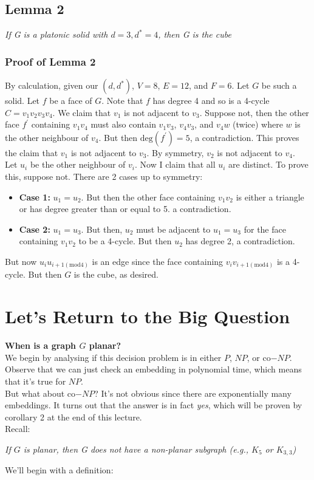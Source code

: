 \documentclass{report}
\begin{document}
\subsection{Lemma 2}
\begin{center}
\textit{If G is a platonic solid with $d = 3, d^* = 4$, then G is the cube}
\end{center}
\subsubsection{Proof of Lemma 2}
By calculation, given our $(d, d^*)$, $V = 8$, $E = 12$, and $F = 6$. Let $G$ be such a solid. Let $f$ be a face of $G$. Note that $f$ has degree 4 and so is a 4-cycle $C = v_1v_2v_3v_4$.
We claim that $v_1$ is not adjacent to $v_3$. Suppose not, then the other face $f^\prime$ containing $v_1v_4$ must also contain $v_1v_3$, $v_4v_3$, and $v_4w$ (twice) where $w$ is the other neighbour of $v_4$. But then $\mathrm{deg}(f^\prime) = 5$, a contradiction. This proves the claim that $v_1$ is not adjacent to $v_3$. By symmetry, $v_2$ is not adjacent to $v_4$.\\
Let $u_i$ be the other neighbour of $v_i$. Now I claim that all $u_i$ are distinct. To prove this, suppose not. There are 2 cases up to symmetry:
\begin{itemize}
\item \textbf{Case 1:} $u_1 = u_2$. But then the other face containing $v_1v_2$ is either a triangle or has degree greater than or equal to 5. a contradiction.
\item \textbf{Case 2:} $u_1=u_3$. But then, $u_2$ must be adjacent to $u_1=u_3$ for the face containing $v_1v_2$ to be a 4-cycle. But then $u_2$ has degree 2, a contradiction.
\end{itemize}
But now $u_iu_{i+1(\mathrm{mod} 4)}$ is an edge since the face containing $v_iv_{i+1(\mathrm{mod} 4)}$ is a 4-cycle. But then $G$ is the cube, as desired.
\section{Let's Return to the Big Question}
\textbf{When is a graph $G$ planar?}\\
We begin by analysing if this decision problem is in either $P$, $NP$, or co$-NP$. Observe that we can just check an embedding in polynomial time, which means that it's true for $NP$.\\
But what about co$-NP$? It's not obvious since there are exponentially many embeddings. It turns out that the answer is in fact \textit{yes}, which will be proven by corollary 2 at the end of this lecture.\\
Recall:
\begin{center}
\textit{If $G$ is planar, then G does not have a non-planar subgraph (e.g., $K_5$ or $K_{3,3}$)}
\end{center}
We'll begin with a definition:
\end{document}

